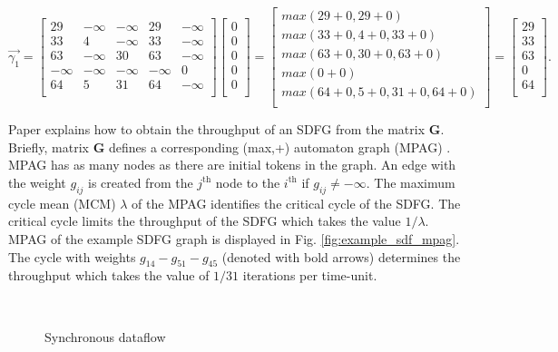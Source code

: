 \documentclass[]{eptcs}
\begin{document}
\[ \vec{\gamma_1} = \begin{bmatrix}
29 & -\infty & -\infty & 29 & -\infty \\
33 & 4 & -\infty & 33 & -\infty\\
63 & -\infty & 30 & 63 & -\infty\\
-\infty & -\infty & -\infty & -\infty & 0\\
64 & 5 & 31 & 64 & -\infty\\
\end{bmatrix}
\begin{bmatrix}
0\\
0\\
0\\
0\\
0\\
\end{bmatrix}=
\begin{bmatrix}
\mathit{max}(29+0,29+0)\\
\mathit{max}(33+0, 4+0, 33+0)\\
\mathit{max}(63+0,30+0,63+0)\\
\mathit{max}(0+0)\\
\mathit{max}(64+0,5+0,31+0,64+0)\\
\end{bmatrix}=
\begin{bmatrix}
29\\
33\\
63\\
0\\
64\\
\end{bmatrix}
.\]

Paper \cite{2geil:all} explains how to obtain the throughput of an SDFG from the matrix $\mathbf{G}$. Briefly, matrix $\mathbf{G}$ defines a corresponding (max,+) automaton graph (MPAG) \cite{2gaub}. MPAG has as many nodes as there are initial tokens in the graph. An edge with the weight $g_{ij}$ is created from the $j^{\mathrm{th}}$ node to the $i^{\mathrm{th}}$ if $g_{ij} \ne -\infty$. The maximum cycle mean (MCM) $\lambda$ of the MPAG identifies the critical cycle of the SDFG. The critical cycle limits the throughput of the SDFG which takes the value $1 / \lambda$. MPAG of the example SDFG graph is displayed in Fig. \ref{fig:example_sdf_mpag}. The cycle with  weights $g_{14}-g_{51}-g_{45}$ (denoted with bold arrows) determines the throughput which takes the value of $1/31$ iterations per time-unit.
\begin{figure}[t]\centering
	~~~~~~~~~~~~~~~
	\caption{Synchronous dataflow}\label{fig:sdf}\end{figure}
\end{document}
